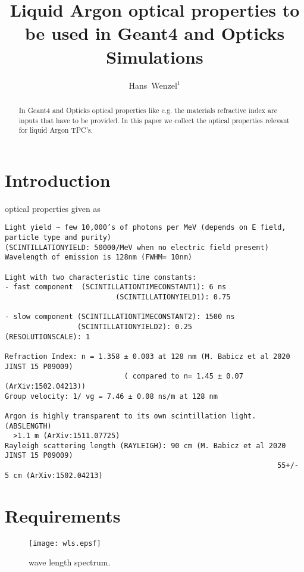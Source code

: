 \documentclass[a4paper]{jpconf}
\begin{document}
\title{Liquid Argon optical properties to be used in Geant4 and Opticks Simulations}

\author{ Hans~Wenzel$^1$}

\address{ $^1$~Fermilab PO Box 500, Batavia, IL 60510,
USA}


\begin{abstract}
  In Geant4 and Opticks optical properties like e.g. the materials refractive
  index are inputs that have to be provided. In this paper we collect the
  optical properties relevant for liquid Argon TPC's.  
\end{abstract}

\section{Introduction}
optical properties given as
\begin{verbatim}
Light yield ~ few 10,000’s of photons per MeV (depends on E field, particle type and purity)
(SCINTILLATIONYIELD: 50000/MeV when no electric field present)
Wavelength of emission is 128nm (FWHM= 10nm)

Light with two characteristic time constants:
- fast component  (SCINTILLATIONTIMECONSTANT1): 6 ns  
  	     	              (SCINTILLATIONYIELD1): 0.75

- slow component (SCINTILLATIONTIMECONSTANT2): 1500 ns
				 (SCINTILLATIONYIELD2): 0.25
(RESOLUTIONSCALE): 1

Refraction Index: n = 1.358 ± 0.003 at 128 nm (M. Babicz et al 2020 JINST 15 P09009)
                            ( compared to n= 1.45 ± 0.07 (ArXiv:1502.04213))
Group velocity: 1/ vg = 7.46 ± 0.08 ns/m at 128 nm

Argon is highly transparent to its own scintillation light. (ABSLENGTH)
  >1.1 m (ArXiv:1511.07725) 
Rayleigh scattering length (RAYLEIGH): 90 cm (M. Babicz et al 2020 JINST 15 P09009)
                                                                55+/- 5 cm (ArXiv:1502.04213)

\end{verbatim}



\section{Requirements}

\begin{figure}[ht]
\begin{center}
\texttt{[image: wls.epsf]}
\end{center}
\caption{\label{fig1}wave length spectrum.}
\end{figure}
\end{document}

